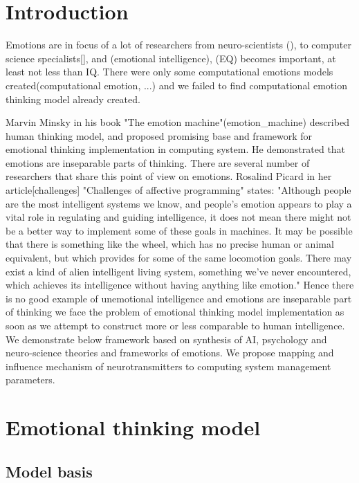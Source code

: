 \section{Introduction}

Emotions are in focus of a lot of researchers from neuro-scientists (), to computer science specialists[], and (emotional intelligence), (EQ) becomes important, at least not less than IQ.
There were only some computational emotions models created(computational emotion, ...) and we failed to find computational emotion thinking model already created.

Marvin Minsky in his book "The emotion machine"(emotion_machine) described human thinking model, and proposed promising base and framework for emotional thinking implementation in computing system. He demonstrated that emotions are inseparable parts of thinking. There are several number of researchers that share this point of view on emotions. Rosalind Picard in her article[challenges] "Challenges of affective programming" states: "Although people are the most intelligent systems we know, and people’s emotion appears to play a vital role in regulating and guiding intelligence, it does not mean there might not be a better way to implement some of these goals in machines. It may be possible that there is something like the wheel, which has no precise human or animal equivalent, but which provides for some of the same locomotion goals. There may exist a kind of alien intelligent living system, something we’ve never encountered, which achieves its intelligence without having anything like emotion."  Hence there is no good example of unemotional intelligence and emotions are inseparable part of thinking we face the problem of emotional thinking model implementation as soon as we attempt to construct more or less comparable to human intelligence. We demonstrate below framework based on synthesis of AI, psychology and neuro-science theories and frameworks of emotions. We propose mapping and influence mechanism of neurotransmitters to computing system management parameters.

\section{Emotional thinking model}

\subsection{Model basis}

